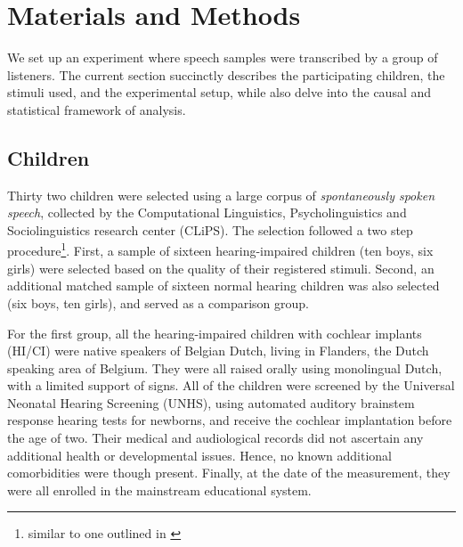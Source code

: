 \section{Materials and Methods} \label{S:materials_methods}
%
We set up an experiment where speech samples were transcribed by a group of listeners. The current section succinctly describes the participating children, the stimuli used, and the experimental setup, while also delve into the causal and statistical framework of analysis.
%
%
\subsection{Children} \label{sS:children}
%
Thirty two children were selected using a large corpus of \textit{spontaneously spoken speech}, collected by the Computational Linguistics, Psycholinguistics and Sociolinguistics research center (CLiPS). The selection followed a two step procedure\footnote{similar to one outlined in \citet{Faes_et_al_2021}}. First, a sample of sixteen hearing-impaired children (ten boys, six girls) were selected based on the quality of their registered stimuli. Second, an additional matched sample of sixteen normal hearing children was also selected (six boys, ten girls), and served as a comparison group.
%
\begin{comment}
	Similar designs were used by \citet{Boonen_et_al_2020} and \citet{Faes_et_al_2021}. However, in the former case the number of samples were low, while in the latter, the design was unbalanced and not conducive to appropriate inferences from the pairwise comparisons.
\end{comment}

For the first group, all the hearing-impaired children with cochlear implants (HI/CI) were native speakers of Belgian Dutch, living in Flanders, the Dutch speaking area of Belgium. They were all raised orally using monolingual Dutch, with a limited support of signs. All of the children were screened by the Universal Neonatal Hearing Screening (UNHS), using automated auditory brainstem response hearing tests for newborns, and receive the cochlear implantation before the age of two. Their medical and audiological records did not ascertain any additional health or developmental issues. Hence, no known additional comorbidities were though present. Finally, at the date of the measurement, they were all enrolled in the mainstream educational system.

